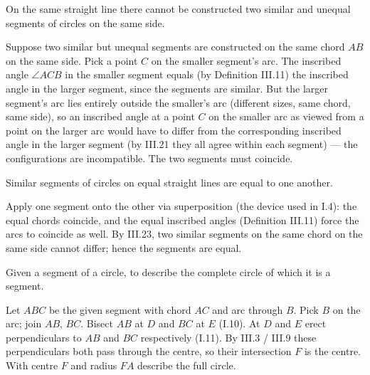 \documentclass{rrxiv}
\begin{document}
\begin{claim}
\label{prop:III.23}
On the same straight line there cannot be constructed two similar
and unequal segments of circles on the same side.
\end{claim}
\begin{evidence}
\label{ev:III.23}
Suppose two similar but unequal segments are constructed on the
same chord $AB$ on the same side.  Pick a point $C$ on the smaller
segment's arc.  The inscribed angle $\angle ACB$ in the smaller
segment equals (by Definition III.11) the inscribed angle in the
larger segment, since the segments are similar.  But the larger
segment's arc lies entirely outside the smaller's arc (different
sizes, same chord, same side), so an inscribed angle at a point
$C$ on the smaller arc as viewed from a point on the larger arc
would have to differ from the corresponding inscribed angle in the
larger segment (by III.21 they all agree within each segment) ---
the configurations are incompatible.  The two segments must
coincide.
\end{evidence}

\begin{claim}
\label{prop:III.24}
Similar segments of circles on equal straight lines are equal to one
another.
\end{claim}
\begin{evidence}
\label{ev:III.24}
Apply one segment onto the other via superposition (the device used
in I.4): the equal chords coincide, and the equal inscribed angles
(Definition III.11) force the arcs to coincide as well.  By III.23,
two similar segments on the same chord on the same side cannot
differ; hence the segments are equal.
\end{evidence}

\begin{claim}
\label{prop:III.25}
Given a segment of a circle, to describe the complete circle of
which it is a segment.
\end{claim}
\begin{evidence}
\label{ev:III.25}
Let $ABC$ be the given segment with chord $AC$ and arc through $B$.
Pick $B$ on the arc; join $AB$, $BC$.  Bisect $AB$ at $D$ and $BC$
at $E$ (I.10).  At $D$ and $E$ erect perpendiculars to $AB$ and
$BC$ respectively (I.11).  By III.3 / III.9 these perpendiculars
both pass through the centre, so their intersection $F$ is the
centre.  With centre $F$ and radius $FA$ describe the full circle.
\end{evidence}
\end{document}

